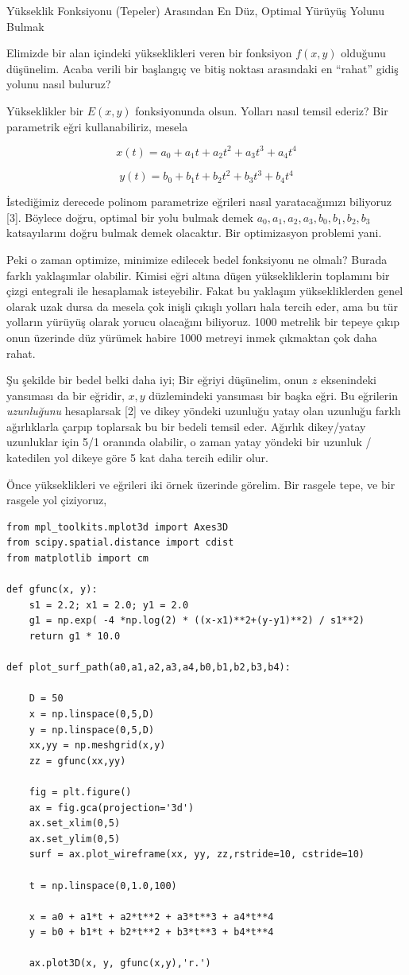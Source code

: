 \documentclass[12pt,fleqn]{article}\usepackage{../../common}
\begin{document}
Yükseklik Fonksiyonu (Tepeler) Arasından En Düz, Optimal Yürüyüş Yolunu Bulmak

Elimizde bir alan içindeki yükseklikleri veren bir fonksiyon $f(x,y)$
olduğunu düşünelim. Acaba verili bir başlangıç ve bitiş noktası arasındaki
en ``rahat'' gidiş yolunu nasıl buluruz? 

Yükseklikler bir $E(x,y)$ fonksiyonunda olsun. Yolları nasıl temsil ederiz?
Bir parametrik eğri kullanabiliriz, mesela 

$$
x(t) = a_0 + a_1 t + a_2 t^2 + a_3 t^3 + a_4 t^4
$$

$$
y(t) = b_0 + b_1 t + b_2 t^2 + b_3 t^3 + b_4 t^4
$$

İstediğimiz derecede polinom parametrize eğrileri nasıl yaratacağımızı
biliyoruz [3]. Böylece doğru, optimal bir yolu bulmak demek
$a_0,a_1,a_2,a_3,b_0,b_1,b_2,b_3$ katsayılarını doğru bulmak demek
olacaktır. Bir optimizasyon problemi yani.

Peki o zaman optimize, minimize edilecek bedel fonksiyonu ne olmalı? Burada
farklı yaklaşımlar olabilir. Kimisi eğri altına düşen yüksekliklerin
toplamını bir çizgi entegrali ile hesaplamak isteyebilir. Fakat bu yaklaşım
yüksekliklerden genel olarak uzak dursa da mesela çok inişli çıkışlı
yolları hala tercih eder, ama bu tür yolların yürüyüş olarak yorucu
olacağını biliyoruz. 1000 metrelik bir tepeye çıkıp onun üzerinde düz
yürümek habire 1000 metreyi inmek çıkmaktan çok daha rahat.

Şu şekilde bir bedel belki daha iyi; Bir eğriyi düşünelim, onun $z$
eksenindeki yansıması da bir eğridir, $x,y$ düzlemindeki yansıması bir
başka eğri. Bu eğrilerin {\em uzunluğunu} hesaplarsak [2] ve dikey yöndeki
uzunluğu yatay olan uzunluğu farklı ağırlıklarla çarpıp toplarsak bu bir
bedeli temsil eder. Ağırlık dikey/yatay uzunluklar için 5/1 oranında
olabilir, o zaman yatay yöndeki bir uzunluk / katedilen yol dikeye göre 5
kat daha tercih edilir olur.

Önce yükseklikleri ve eğrileri iki örnek üzerinde görelim. Bir rasgele
tepe, ve bir rasgele yol çiziyoruz,

\begin{verbatim}
from mpl_toolkits.mplot3d import Axes3D
from scipy.spatial.distance import cdist
from matplotlib import cm

def gfunc(x, y):
    s1 = 2.2; x1 = 2.0; y1 = 2.0
    g1 = np.exp( -4 *np.log(2) * ((x-x1)**2+(y-y1)**2) / s1**2)
    return g1 * 10.0

def plot_surf_path(a0,a1,a2,a3,a4,b0,b1,b2,b3,b4):

    D = 50
    x = np.linspace(0,5,D)
    y = np.linspace(0,5,D)
    xx,yy = np.meshgrid(x,y)
    zz = gfunc(xx,yy)

    fig = plt.figure()
    ax = fig.gca(projection='3d')
    ax.set_xlim(0,5)
    ax.set_ylim(0,5)
    surf = ax.plot_wireframe(xx, yy, zz,rstride=10, cstride=10)

    t = np.linspace(0,1.0,100)

    x = a0 + a1*t + a2*t**2 + a3*t**3 + a4*t**4 
    y = b0 + b1*t + b2*t**2 + b3*t**3 + b4*t**4

    ax.plot3D(x, y, gfunc(x,y),'r.')
\end{verbatim}
\end{document}
